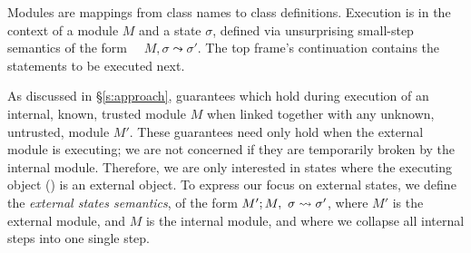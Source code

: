  Modules are mappings
from class names to class definitions. 
Execution 
is in the context of  a module $M$ and   a state $\sigma$,
 defined via unsurprising small-step semantics of the form \ \ 
   $M, \sigma \leadsto \sigma'$.
The   top frame's continuation contains the statements to be %
executed next.
 
As discussed in \S \ref{s:approach}, %
guarantees which hold
during execution of an internal, 
known, trusted module $M$ when linked together with any
unknown, untrusted, module $M'$. These guarantees need only hold 
when the external module is executing; we are not concerned if they are
temporarily broken by the internal module. Therefore, we are only interested in states where the
executing object (\prg{this}) is an external object. 
To express our focus on external states, we define the  \emph{external states semantics}, of the form 
$M' ; M,\ \sigma \leadsto \sigma'$, where $M'$ is the external
module, and $M$ is the internal module, and where we
collapse all internal steps into one single step.

 

